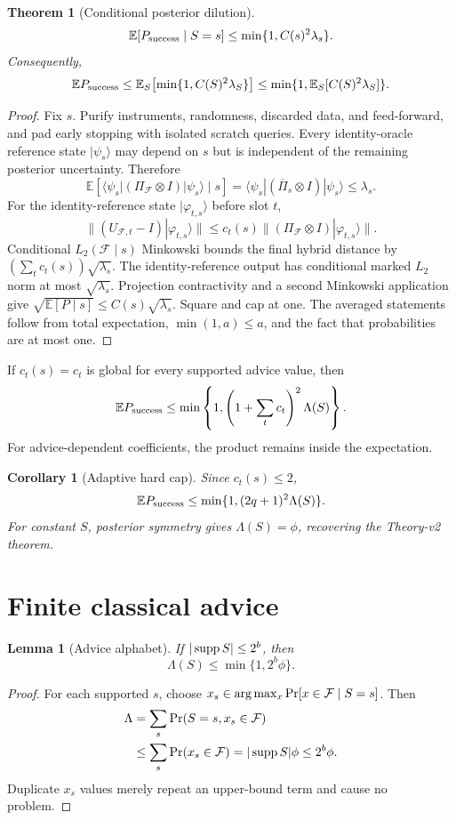 \documentclass[11pt]{article}
\newtheorem{theorem}{Theorem}
\newtheorem{corollary}{Corollary}
\newtheorem{lemma}{Lemma}
\newcommand{\F}{\mathcal F}
\newcommand{\E}{\mathbb E}
\newcommand{\Prb}{\mathop{\rm Pr}}
\newcommand{\supp}{\mathop{\rm supp}}
\begin{document}
\begin{theorem}[Conditional posterior dilution]
\[
 \E[P_{\rm success}\mid S=s]
 \le \min\{1,C(s)^2\lambda_s\}.
\]
Consequently,
\[
 \E P_{\rm success}
 \le \E_S\!\left[\min\{1,C(S)^2\lambda_S\}\right]
 \le \min\{1,\E_S[C(S)^2\lambda_S]\}.
\]
\end{theorem}
\begin{proof}
Fix $s$.  Purify instruments, randomness, discarded data, and feed-forward,
and pad early stopping with isolated scratch queries.  Every identity-oracle
reference state $|\psi_s\rangle$ may depend on $s$ but is independent of the
remaining posterior uncertainty.  Therefore
\[
 \E[\langle\psi_s|(\Pi_{\F}\otimes I)|\psi_s\rangle\mid s]
 =\langle\psi_s|(\overline\Pi_s\otimes I)|\psi_s\rangle
 \le\lambda_s.
\]
For the identity-reference state $|\varphi_{t,s}\rangle$ before slot $t$,
\[
 \|(U_{\F,t}-I)|\varphi_{t,s}\rangle\|
 \le c_t(s)\|(\Pi_{\F}\otimes I)|\varphi_{t,s}\rangle\|.
\]
Conditional $L_2(\F\mid s)$ Minkowski bounds the final hybrid distance by
$(\sum_t c_t(s))\sqrt{\lambda_s}$.  The identity-reference output has
conditional marked $L_2$ norm at most $\sqrt{\lambda_s}$.  Projection
contractivity and a second Minkowski application give
$\sqrt{\E[P\mid s]}\le C(s)\sqrt{\lambda_s}$.  Square and cap at one.
The averaged statements follow from total expectation, $\min(1,a)\le a$,
and the fact that probabilities are at most one.
\end{proof}

If $c_t(s)=c_t$ is global for every supported advice value, then
\[
 \E P_{\rm success}
 \le\min\left\{1,
 \left(1+\sum_t c_t\right)^2\Lambda(S)\right\}.
\]
For advice-dependent coefficients, the product remains inside the expectation.

\begin{corollary}[Adaptive hard cap]
Since $c_t(s)\le2$,
\[
 \E P_{\rm success}
 \le\min\{1,(2q+1)^2\Lambda(S)\}.
\]
For constant $S$, posterior symmetry gives $\Lambda(S)=\phi$, recovering the
Theory-v2 theorem.
\end{corollary}

\section{Finite classical advice}
\begin{lemma}[Advice alphabet]
If $|\supp S|\le2^b$, then
\[
 \Lambda(S)\le\min\{1,2^b\phi\}.
\]
\end{lemma}
\begin{proof}
For each supported $s$, choose
$x_s\in\arg\max_x\Prb[x\in\F\mid S=s]$.  Then
\[
\begin{aligned}
 \Lambda
 &=\sum_s\Prb(S=s,x_s\in\F)\\
 &\le\sum_s\Prb(x_s\in\F)
 =|\supp S|\phi\le2^b\phi.
\end{aligned}
\]
Duplicate $x_s$ values merely repeat an upper-bound term and cause no problem.
\end{proof}
\end{document}
